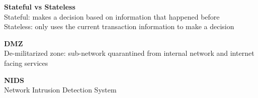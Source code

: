 \documentclass[10pt,letterpaper,landscape]{report}
\newcommand{\boxheight}{21.59cm}
\newcommand{\boxwidth}{8.85cm}
\begin{document}
\begin{small}
{\begin{minipage}[t][\boxheight][c]{\boxwidth}
		\textbf{Stateful vs Stateless}\\
		Stateful: makes a decision based on information that happened before\\
		Stateless: only uses the current transaction information to make a decision
		
		
		\textbf{DMZ}\\
		De-militarized zone: sub-network quarantined from internal network and internet facing services
		
		\textbf{NIDS} \\
		Network Intrusion Detection System
		
		
	\end{minipage}
}

\fbox{
\begin{minipage}[t][\boxheight][c]{\boxwidth}
		
		
		
		TEST
		
		
		
		
	\end{minipage}
}
\end{small}
\end{document}

